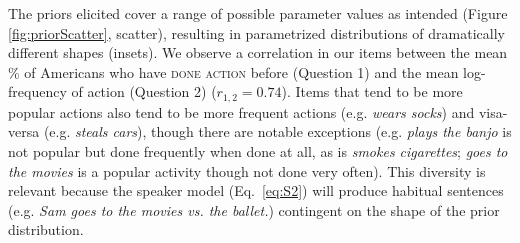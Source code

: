 \documentclass[10pt,letterpaper]{article}
\begin{document}
The priors elicited cover a range of possible parameter values as intended (Figure \ref{fig:priorScatter}, scatter), resulting in parametrized distributions of dramatically different shapes (insets).  
We observe a correlation in our items between the mean \% of Americans who have \textsc{done action} before (Question 1) and the mean log-frequency  of action (Question 2) ($r_{1,2} = 0.74$).
Items that tend to be more popular actions also tend to be more frequent actions (e.g. \emph{wears socks}) and visa-versa (e.g. \emph{steals cars}), though there are notable exceptions (e.g. \emph{plays the banjo} is not popular but done frequently when done at all, as is \emph{smokes cigarettes}; \emph{goes to the movies} is a popular activity though not done very often). 
This diversity is relevant because the speaker model (Eq.~\ref{eq:S2}) will produce habitual sentences (e.g. \emph{Sam goes to the movies vs. the ballet.}) contingent on the shape of the prior distribution. 
\end{document}
